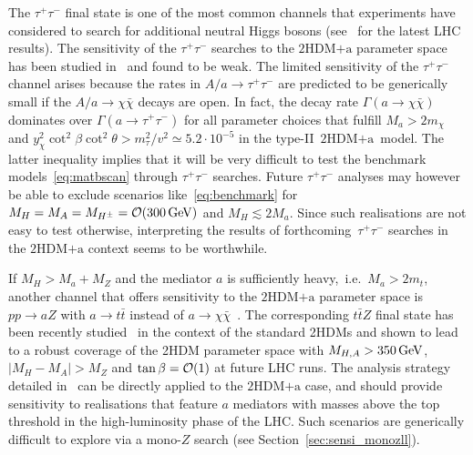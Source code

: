 \documentclass[a4paper, 11pt,notoc]{article}
\newcommand{\mA}{\ensuremath{M_{A}}\xspace}
\newcommand{\ma}{\ensuremath{M_{a}}\xspace}
\newcommand{\mH}{\ensuremath{M_{H}}\xspace}
\newcommand{\mHc}{\ensuremath{M_{H^{\pm}}}\xspace}
\newcommand{\hdma}{\ensuremath{\textrm{2HDM+a}}\xspace}
\begin{document}
The $\tau^+ \tau^-$ final state is one of the most common channels that experiments have considered to search for additional neutral Higgs bosons (see~\cite{Aaboud:2017sjh,Sirunyan:2018zut} for the latest LHC results).   The sensitivity of the $\tau^+ \tau^-$ searches to the \hdma parameter space has been studied in~\cite{Bauer:2017ota} and found to be weak. The limited sensitivity of the $\tau^+ \tau^-$ channel arises because the rates in  $A/a \to \tau^+ \tau^-$  are predicted to be generically small if the $A/a \to \chi \bar \chi$ decays are open. In fact, the decay rate $\Gamma ( a \to \chi \bar \chi )$ dominates over  $\Gamma ( a \to \tau^+ \tau^- )$ for all parameter choices that fulfill $M_a > 2 m_\chi$ and  $y_\chi^2  \cot^2 \beta \cot^2 \theta > m_\tau^2/v^2 \simeq 5.2 \cdot 10^{-5}$ in the type-II~\hdma~model. The latter inequality implies that it will be very difficult to test the benchmark models~\eqref{eq:matbscan} through  $\tau^+ \tau^-$ searches. Future  $\tau^+ \tau^-$ analyses may however be able to exclude scenarios like~\eqref{eq:benchmark} for $\mH = \mA = \mHc = {\cal O} (300 \, {\rm GeV})$ and $M_H \lesssim 2M_a$. Since such realisations are not easy to test otherwise, interpreting the results of forthcoming~$\tau^+ \tau^-$ searches in the \hdma context seems to be worthwhile.

If $\mH > \ma + M_Z$ and the mediator $a$ is sufficiently heavy,~i.e.~$\ma > 2 m_t$, another channel that offers sensitivity to the  $\hdma$ parameter space is $pp \to aZ$ with $a \to t \bar t$ instead of $a \to \chi \bar \chi$~\cite{GPHeidelberg}. The corresponding $t \bar t Z$ final state has been recently studied~\cite{Haisch:2018djm} in the context of the standard 2HDMs and shown to lead to a robust coverage of the 2HDM parameter space with $M_{H,A} > 350 \, {\rm GeV}$, $|M_H - M_A| > M_Z$ and $\tan \beta = {\cal O} (1)$ at future LHC runs.  The analysis strategy detailed in~\cite{Haisch:2018djm} can be directly applied to the \hdma case, and should provide sensitivity to realisations that feature $a$ mediators with masses above the top threshold in the high-luminosity phase of the LHC. Such scenarios are generically difficult to explore via a mono-$Z$ search (see Section~\ref{sec:sensi_monozll}).
\end{document}
